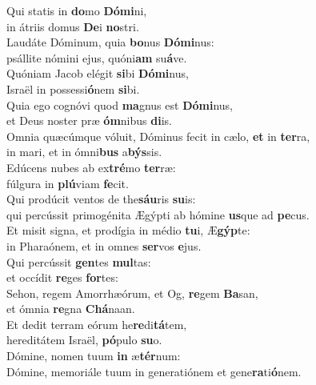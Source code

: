 \evenverse Qui statis in \textbf{do}mo \textbf{Dó}\textbf{mi}ni,~\*\\
\evenverse in átriis domus \textbf{De}i \textbf{no}stri.\\
\oddverse Laudáte Dóminum, quia \textbf{bo}nus \textbf{Dó}\textbf{mi}nus:~\*\\
\oddverse psállite nómini ejus, quóni\textbf{am} su\textbf{á}ve.\\
\evenverse Quóniam Jacob elégit \textbf{si}bi \textbf{Dó}\textbf{mi}nus,~\*\\
\evenverse Israël in possessi\textbf{ó}nem \textbf{si}bi.\\
\oddverse Quia ego cognóvi quod \textbf{ma}gnus est \textbf{Dó}\textbf{mi}nus,~\*\\
\oddverse et Deus noster præ \textbf{óm}nibus \textbf{di}is.\\
\evenverse Omnia quæcúmque vóluit, Dóminus fecit in cælo, \textbf{et} in \textbf{ter}ra,~\*\\
\evenverse in mari, et in ómni\textbf{bus} a\textbf{býs}sis.\\
\oddverse Edúcens nubes ab ex\textbf{tré}mo \textbf{ter}ræ:~\*\\
\oddverse fúlgura in \textbf{plú}viam \textbf{fe}cit.\\
\evenverse Qui prodúcit ventos de the\textbf{sáu}ris \textbf{su}is:~\*\\
\evenverse qui percússit primogénita Ægýpti ab hómine \textbf{us}que ad \textbf{pe}cus.\\
\oddverse Et misit signa, et prodígia in médio \textbf{tu}i, Æ\textbf{gýp}te:~\*\\
\oddverse in Pharaónem, et in omnes \textbf{ser}vos \textbf{e}jus.\\
\evenverse Qui percússit \textbf{gen}tes \textbf{mul}tas:~\*\\
\evenverse et occídit \textbf{re}ges \textbf{for}tes:\\
\oddverse Sehon, regem Amorrhæórum, et Og, \textbf{re}gem \textbf{Ba}san,~\*\\
\oddverse et ómnia \textbf{re}gna \textbf{Chá}naan.\\
\evenverse Et dedit terram eórum he\textbf{re}di\textbf{tá}tem,~\*\\
\evenverse hereditátem Israël, \textbf{pó}pulo \textbf{su}o.\\
\oddverse Dómine, nomen tuum \textbf{in} æ\textbf{tér}num:~\*\\
\oddverse Dómine, memoriále tuum in generatiónem et gene\textbf{ra}ti\textbf{ó}nem.\\
